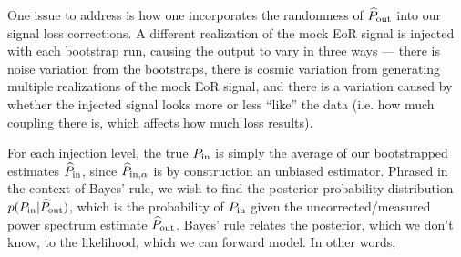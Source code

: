 \documentclass[preprint2,numberedappendix,tighten]{aastex6}
\newcommand{\phat}{\widehat{\mathbf{p}}}
\newcommand{\acl}[1]{{\color{red} \textbf{[ACL:  #1]}}}
\newcommand{\dcj}[1]{{\color{orange} \textbf{[DCJ: #1]}}}
\begin{document}

One issue to address is how one incorporates the randomness of $\widehat{P}_{\rm out}$ into our signal loss corrections. A different realization of the mock EoR signal is injected with each bootstrap run, causing the output to vary in three ways ---  there is noise variation from the bootstraps, there is cosmic variation from generating multiple realizations of the mock EoR signal, and there is a variation caused by whether the injected signal looks more or less ``like'' the data (i.e. how much coupling there is, which affects how much loss results). 

For each injection level, the true $P_{\rm in}$ is simply the average of our bootstrapped estimates $\widehat{P}_{\rm in}$, since $\widehat{P}_{\rm in, \alpha}$ is by construction an unbiased estimator. Phrased in the context of Bayes' rule, we wish to find the posterior probability distribution $p(P_{\rm in} | 
\widehat{P}_{\rm out})$, which is the probability of $P_{\rm in}$ given the uncorrected/measured power spectrum estimate $\widehat{P}_{\rm out}$.  Bayes' rule relates the posterior, which we don't know, to the likelihood, which we can forward model. In other words,
\end{document}
